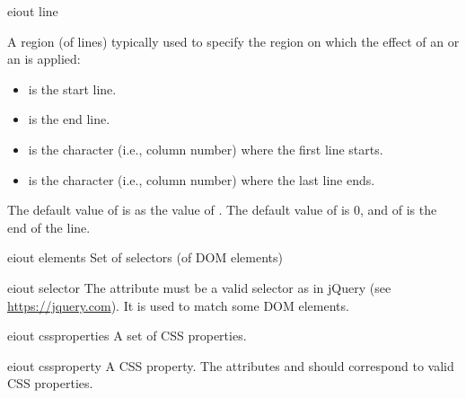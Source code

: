 \bigskip
\xmlstruct
{eiout}
{line}
{%
%
  A region (of lines) typically used to specify the region on which
  the effect of an  or an
   is applied:
%
\begin{itemize}
\item {} is the start line.
\item {} is the end line.
\item {} is the character (i.e., column number)
  where the first line starts.
\item {} is the character (i.e., column number)
  where the last line ends.
\end{itemize}
%
The default value of  is as the value of
. The default value of  is
0, and of  is the end of the line.
%
}


\bigskip
\xmlstruct
{eiout}
{elements}
{%
  Set of selectors (of DOM elements)
} 

\bigskip
\xmlstruct
{eiout}
{selector}
{%
%
  The attribute  must be a valid selector as in
  jQuery (see \url{https://jquery.com}). It is used to match some DOM
  elements.
%
}


\bigskip
\xmlstruct
{eiout}
{cssproperties}
{%
%
A set of CSS properties.
%
}


\bigskip
\xmlstruct
{eiout}
{cssproperty}
{%
%
  A CSS property. The attributes  and
   should correspond to valid CSS properties.
%
}


